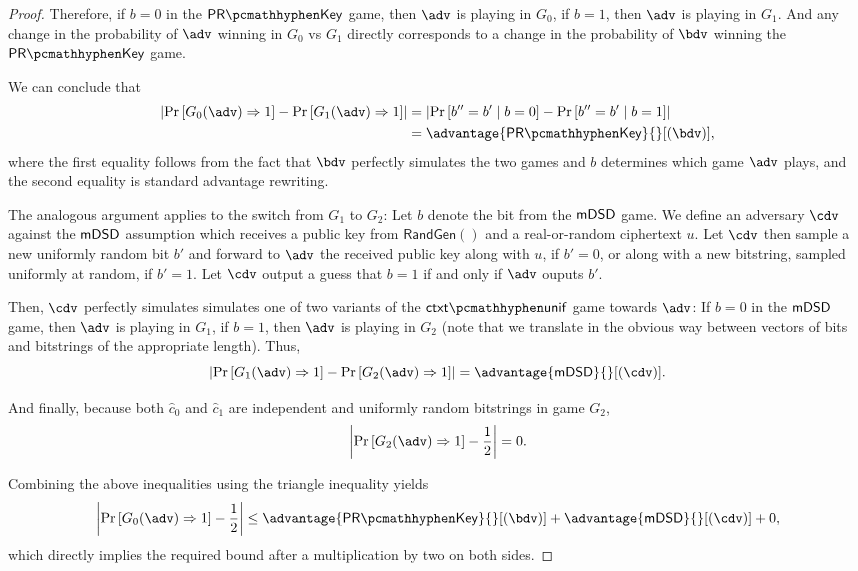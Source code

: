 \begin{proof}
    Therefore, if $b=0$ in the $\prkey$ game, then $\adv$ is playing in $G_0$, if $b=1$, then $\adv$ is playing in $G_1$.
    And any change in the probability of $\adv$ winning in $G_0$ vs $G_1$ directly corresponds to a change in the probability of $\bdv$ winning the $\prkey$ game. 

    We can conclude that
    \begin{align*}
        \left|
            \Pr\left[G_0(\adv) \Rightarrow 1 \right] - \Pr\left[G_1(\adv) \Rightarrow 1 \right]
        \right|
        &= 
        \left|
            \Pr\left[b''=b' \mid b=0 \right] - \Pr\left[b''=b' \mid b=1 \right]
        \right| \\
        &= \advantage{\prkey}{}[(\bdv)],
    \end{align*}
    where the first equality follows from the fact that $\bdv$ perfectly simulates the two games and $b$ determines which game $\adv$ plays, and the second equality is standard advantage rewriting.

    The analogous argument applies to the switch from $G_1$ to $G_2$: Let $b$ denote the bit from the $\mathsf{mDSD}$ game. We define an adversary $\cdv$ against the $\mathsf{mDSD}$ assumption which receives a public key from $\textsf{RandGen}()$ and a real-or-random ciphertext $u$. Let $\cdv$ then sample a new uniformly random bit $b'$ and forward to $\adv$ the received public key along with $u$, if $b'=0$, or along with a new bitstring, sampled uniformly at random, if $b'=1$.
    Let $\cdv$ output a guess that $b=1$ if and only if $\adv$ ouputs $b'$.
    
    Then, $\cdv$ perfectly simulates simulates one of two variants of the $\ctxtunif$ game towards $\adv$: If $b=0$ in the $\mathsf{mDSD}$ game, then $\adv$ is playing in $G_1$, if $b=1$, then $\adv$ is playing in $G_2$ (note that we translate in the obvious way between vectors of bits and bitstrings of the appropriate length). Thus,
    \[
        \left|
            \Pr\left[G_1(\adv) \Rightarrow 1 \right] - \Pr\left[G_2(\adv) \Rightarrow 1 \right]
        \right|
        = \advantage{\mdsd}{}[(\cdv)].
    \]

    And finally, because both $\hat c_0$ and $\hat c_1$ are independent and uniformly random bitstrings in game $G_2$,
    \[
        \left|
            \Pr\left[G_2(\adv) \Rightarrow 1\right] - \frac{1}{2}
        \right|
        = 0.
    \]

    Combining the above inequalities using the triangle inequality yields
    \[
        \left|
            \Pr\left[G_0(\adv) \Rightarrow 1 \right] - \frac{1}{2}
        \right|
        \leq \advantage{\prkey}{}[(\bdv)] + \advantage{\mdsd}{}[(\cdv)] + 0,
    \]
    which directly implies the required bound after a multiplication by two on both sides.
\end{proof}
